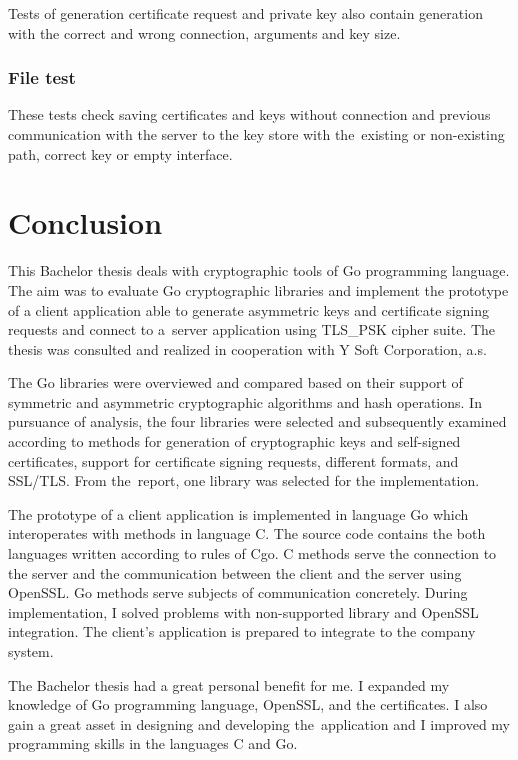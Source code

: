 \documentclass[
  twoside, 12pt, 
  printed, %
  notable,   %
  lof,     %
  lot,     %
]{fithesis3}
\begin{document}
Tests of generation certificate request and private key also contain generation with the correct 
and wrong connection, arguments and key size.

\subsection{File test}
These tests check saving certificates and keys without connection and previous communication with 
the server to the key store with the~existing or non-existing path, correct key or empty 
interface. 





\chapter{Conclusion}
This Bachelor thesis deals with cryptographic tools of Go programming language. The aim was to 
evaluate Go cryptographic libraries and implement the prototype of a client application able to 
generate asymmetric keys and certificate signing requests and connect to a~server application 
using TLS\_PSK cipher suite. The thesis was consulted and realized in cooperation with Y Soft 
Corporation, a.s.

The Go libraries were overviewed and compared based on their support of symmetric and asymmetric 
cryptographic algorithms and hash operations. In pursuance of analysis, the four libraries were 
selected and subsequently examined according to methods for generation of cryptographic keys and 
self-signed certificates, support for certificate signing requests, different formats, and 
SSL/TLS. From the~report, one library was selected for the implementation.

The prototype of a client application is implemented in language Go which interoperates with 
methods in language C. The source code contains the both languages written according to rules of 
Cgo. C methods serve the connection to the server and the communication between the client and 
the server using OpenSSL. Go methods serve subjects of communication concretely. During 
implementation, I solved problems with non-supported library and OpenSSL integration. The 
client's application is prepared to integrate to the company system.

The Bachelor thesis had a great personal benefit for me. I expanded my knowledge of Go 
programming language, OpenSSL, and the certificates. I also gain a great asset in designing and 
developing the~application and I improved my programming skills in the languages C and Go. 



\printbibliography
\end{document}

